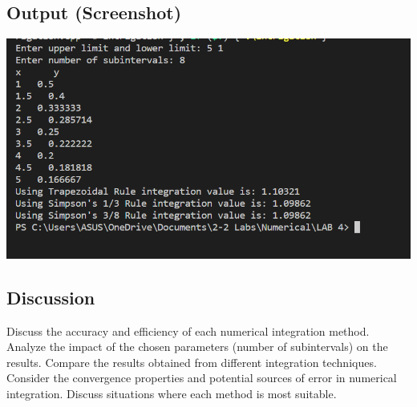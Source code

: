 \documentclass{article}
\begin{document}
\subsection*{Output (Screenshot)}
\includegraphics[width=\textwidth]{lab4.png}

\subsection*{Discussion}
Discuss the accuracy and efficiency of each numerical integration method. Analyze the impact of the chosen parameters (number of subintervals) on the results. Compare the results obtained from different integration techniques. Consider the convergence properties and potential sources of error in numerical integration. Discuss situations where each method is most suitable.
\end{document}
